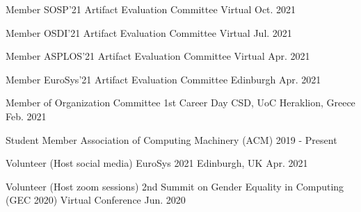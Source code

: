 
\begin{cvhonors}
  \cvhonor
    {Member} %
    {SOSP'21 Artifact Evaluation Committee} %
    {Virtual} %
    {Oct. 2021} %

  \cvhonor
    {Member} %
    {OSDI'21 Artifact Evaluation Committee} %
    {Virtual} %
    {Jul. 2021} %

  \cvhonor
    {Member} %
    {ASPLOS'21 Artifact Evaluation Committee} %
    {Virtual} %
    {Apr. 2021} %


  \cvhonor
    {Member} %
    {EuroSys'21 Artifact Evaluation Committee} %
    {Edinburgh} %
    {Apr. 2021} %
	
  \cvhonor
    {Member of Organization Committee} %
    {1st Career Day CSD, UoC} %
    {Heraklion, Greece} %
    {Feb. 2021} %

  \cvhonor
    {Student Member} %
    {Association of Computing Machinery (ACM)} %
    {} %
    {2019 - Present} %

  \cvhonor
    {Volunteer (Host social media)} %
    {EuroSys 2021} %
    {Edinburgh, UK} %
    {Apr. 2021} %

  \cvhonor
    {Volunteer (Host zoom sessions)} %
    {2nd Summit on Gender Equality in Computing (GEC 2020)} %
    {Virtual Conference} %
    {Jun. 2020} %



\end{cvhonors}
